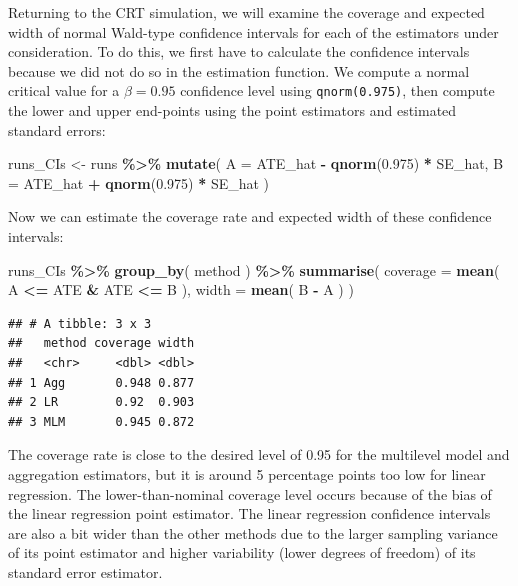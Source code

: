 \documentclass[
]{book}
\newenvironment{Shaded}{\begin{snugshade}}{\end{snugshade}}
\newcommand{\AttributeTok}[1]{\textcolor[rgb]{0.13,0.29,0.53}{#1}}
\newcommand{\FloatTok}[1]{\textcolor[rgb]{0.00,0.00,0.81}{#1}}
\newcommand{\FunctionTok}[1]{\textcolor[rgb]{0.13,0.29,0.53}{\textbf{#1}}}
\newcommand{\NormalTok}[1]{#1}
\newcommand{\OtherTok}[1]{\textcolor[rgb]{0.56,0.35,0.01}{#1}}
\newcommand{\SpecialCharTok}[1]{\textcolor[rgb]{0.81,0.36,0.00}{\textbf{#1}}}
\begin{document}
Returning to the CRT simulation, we will examine the coverage and expected width of normal Wald-type confidence intervals for each of the estimators under consideration.
To do this, we first have to calculate the confidence intervals because we did not do so in the estimation function.
We compute a normal critical value for a \(\beta = 0.95\) confidence level using \texttt{qnorm(0.975)}, then compute the lower and upper end-points using the point estimators and estimated standard errors:

\begin{Shaded}
\begin{Highlighting}[]
\NormalTok{runs\_CIs }\OtherTok{\textless{}{-}} 
\NormalTok{  runs }\SpecialCharTok{\%\textgreater{}\%} 
  \FunctionTok{mutate}\NormalTok{( }
    \AttributeTok{A =}\NormalTok{ ATE\_hat }\SpecialCharTok{{-}} \FunctionTok{qnorm}\NormalTok{(}\FloatTok{0.975}\NormalTok{) }\SpecialCharTok{*}\NormalTok{ SE\_hat,}
    \AttributeTok{B =}\NormalTok{ ATE\_hat }\SpecialCharTok{+} \FunctionTok{qnorm}\NormalTok{(}\FloatTok{0.975}\NormalTok{) }\SpecialCharTok{*}\NormalTok{ SE\_hat}
\NormalTok{  )}
\end{Highlighting}
\end{Shaded}

Now we can estimate the coverage rate and expected width of these confidence intervals:

\begin{Shaded}
\begin{Highlighting}[]
\NormalTok{runs\_CIs }\SpecialCharTok{\%\textgreater{}\%}
  \FunctionTok{group\_by}\NormalTok{( method ) }\SpecialCharTok{\%\textgreater{}\%}
  \FunctionTok{summarise}\NormalTok{( }
    \AttributeTok{coverage =} \FunctionTok{mean}\NormalTok{( A }\SpecialCharTok{\textless{}=}\NormalTok{ ATE }\SpecialCharTok{\&}\NormalTok{ ATE }\SpecialCharTok{\textless{}=}\NormalTok{ B ),}
    \AttributeTok{width =} \FunctionTok{mean}\NormalTok{( B }\SpecialCharTok{{-}}\NormalTok{ A )}
\NormalTok{  )}
\end{Highlighting}
\end{Shaded}

\begin{verbatim}
## # A tibble: 3 x 3
##   method coverage width
##   <chr>     <dbl> <dbl>
## 1 Agg       0.948 0.877
## 2 LR        0.92  0.903
## 3 MLM       0.945 0.872
\end{verbatim}

The coverage rate is close to the desired level of 0.95 for the multilevel model and aggregation estimators, but it is around 5 percentage points too low for linear regression.
The lower-than-nominal coverage level occurs because of the bias of the linear regression point estimator.
The linear regression confidence intervals are also a bit wider than the other methods due to the larger sampling variance of its point estimator and higher variability (lower degrees of freedom) of its standard error estimator.
\end{document}

